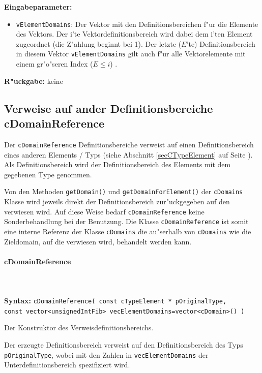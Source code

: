 \bigskip\noindent
\textbf{Eingabeparameter:}
\begin{itemize}
 \item \verb|vElementDomains|: Der Vektor mit den Definitionsbereichen f"ur die Elemente des Vektors. Der i'te Vektordefinitionsbereich wird dabei dem i'ten Element zugeordnet (die Z"ahlung beginnt bei 1). Der letzte ($E$'te) Definitionsbereich in diesem Vektor \verb|vElementDomains| gilt auch f"ur alle Vektorelemente mit einem gr"o"seren Index ($E \leq i$) .
\end{itemize}

\bigskip\noindent
\textbf{R"uckgabe:} keine



\subsection{Verweise auf ander Definitionsbereiche cDomainReference}

Der \verb|cDomainReference| Definitionsbereiche verweist auf einen Definitionsbereich eines anderen Elements / Typs (siehe Abschnitt \ref{secCTypeElement} auf Seite \pageref{secCTypeElement}).
Als Definitionsbereich wird der Definitionsbereich des Elements mit dem gegebenen Type genommen.

Von den Methoden \verb|getDomain()| und \verb|getDomainForElement()| der \verb|cDomains| Klasse wird jeweils direkt der Definitionsbereich zur"uckgegeben auf den verwiesen wird. Auf diese Weise bedarf \verb|cDomainReference| keine Sonderbehandlung bei der Benutzung. Die Klasse \verb|cDomainReference| ist somit eine interne Referenz der Klasse \verb|cDomains| die au"serhalb von \verb|cDomains| wie die Zieldomain, auf die verwiesen wird, behandelt werden kann.


\paragraph{cDomainReference}

\ \\\\\noindent
\textbf{Syntax:} \verb|cDomainReference( const cTypeElement * pOriginalType,| \\\verb|const vector<unsignedIntFib> vecElementDomains=vector<cDomain>() )|

\bigskip\noindent
Der Konstruktor des Verweisdefinitionsbereichs.

Der erzeugte Definitionsbereich verweist auf den Definitionsbereich des Typs \verb|pOriginalType|, wobei mit den Zahlen in \verb|vecElementDomains| der Unterdefinitionsbereich spezifiziert wird.

